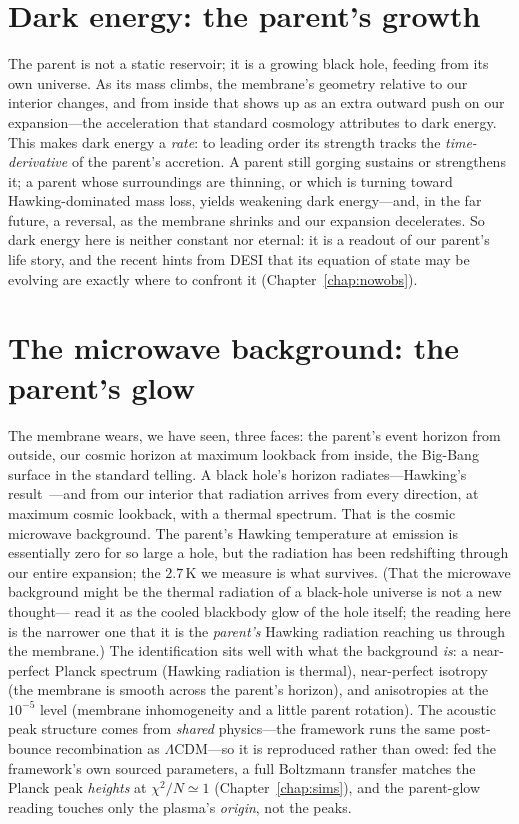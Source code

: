 \section{Dark energy: the parent's growth}
\label{sec:dark-energy}

The parent is not a static reservoir; it is a growing black hole, feeding from its
own universe. As its mass climbs, the membrane's geometry relative to our interior
changes, and from inside that shows up as an extra outward push on our
expansion---the acceleration that standard cosmology attributes to dark energy.
This makes dark energy a \emph{rate}: to leading order its strength tracks the
\emph{time-derivative} of the parent's accretion. A parent still gorging sustains
or strengthens it; a parent whose surroundings are thinning, or which is turning
toward Hawking-dominated mass loss, yields weakening dark energy---and, in the far
future, a reversal, as the membrane shrinks and our expansion decelerates. So
dark energy here is neither constant nor eternal: it is a readout of our parent's
life story, and the recent hints from DESI that its equation of state may be
evolving are exactly where to confront it (Chapter~\ref{chap:nowobs}).

\section{The microwave background: the parent's glow}
\label{sec:cmb}

The membrane wears, we have seen, three faces: the parent's event horizon from
outside, our cosmic horizon at maximum lookback from inside, the Big-Bang surface
in the standard telling. A black hole's horizon radiates---Hawking's
result~\citep{hawking1975}---and from our interior that radiation arrives from
every direction, at
maximum cosmic lookback, with a thermal spectrum. That is the cosmic microwave
background. The parent's Hawking temperature at emission is essentially zero for so
large a hole, but the radiation has been redshifting through our entire expansion;
the $2.7\,\mathrm{K}$ we measure is what survives. (That the microwave background might
be the thermal radiation of a black-hole universe is not a new thought---\citet{zhang2009cmb}
read it as the cooled blackbody glow of the hole itself; the reading here is the
narrower one that it is the \emph{parent's} Hawking radiation reaching us through the
membrane.) The identification sits well
with what the background \emph{is}: a near-perfect Planck spectrum (Hawking
radiation is thermal), near-perfect isotropy (the membrane is smooth across the
parent's horizon), and anisotropies at the $10^{-5}$ level (membrane inhomogeneity
and a little parent rotation). The acoustic peak structure comes from \emph{shared}
physics---the framework runs the same post-bounce recombination as $\Lambda$CDM---so
it is reproduced rather than owed: fed the framework's own sourced parameters, a full
Boltzmann transfer matches the Planck peak \emph{heights} at $\chi^2/N\simeq1$
(Chapter~\ref{chap:sims}), and the parent-glow reading touches only the plasma's
\emph{origin}, not the peaks.

